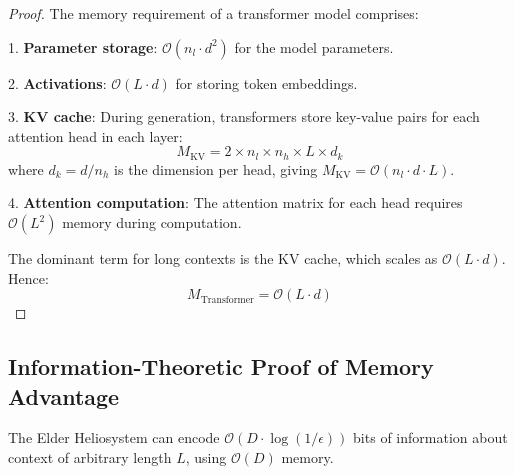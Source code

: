\begin{proof}
The memory requirement of a transformer model comprises:

1. \textbf{Parameter storage}: $\mathcal{O}(n_l \cdot d^2)$ for the model parameters.

2. \textbf{Activations}: $\mathcal{O}(L \cdot d)$ for storing token embeddings.

3. \textbf{KV cache}: During generation, transformers store key-value pairs for each attention head in each layer:
   \begin{equation}
   M_{\text{KV}} = 2 \times n_l \times n_h \times L \times d_k
   \end{equation}
   where $d_k = d/n_h$ is the dimension per head, giving $M_{\text{KV}} = \mathcal{O}(n_l \cdot d \cdot L)$.

4. \textbf{Attention computation}: The attention matrix for each head requires $\mathcal{O}(L^2)$ memory during computation.

The dominant term for long contexts is the KV cache, which scales as $\mathcal{O}(L \cdot d)$. Hence:
\begin{equation}
M_{\text{Transformer}} = \mathcal{O}(L \cdot d)
\end{equation}
\end{proof}

\subsection{Information-Theoretic Proof of Memory Advantage}

\begin{theorem}
The Elder Heliosystem can encode $\mathcal{O}(D \cdot \log(1/\epsilon))$ bits of information about context of arbitrary length $L$, using $\mathcal{O}(D)$ memory.
\end{theorem}

